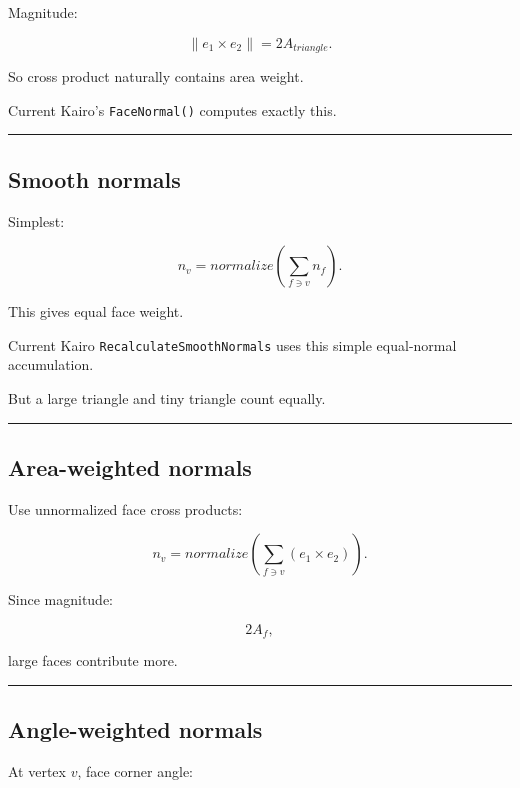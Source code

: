 Magnitude:

\[
\|e_1\times e_2\|
=
2A_{triangle}.
\]

So cross product naturally contains area weight.

Current Kairo's \texttt{FaceNormal()} computes exactly this.

\begin{center}\rule{0.5\linewidth}{0.5pt}\end{center}

\subsection{Smooth normals}\label{04-visual-computing-ii-ch041-smooth-normals}

Simplest:

\[
n_v=
normalize
\left(
\sum_{f\ni v}
n_f
\right).
\]

This gives equal face weight.

Current Kairo \texttt{RecalculateSmoothNormals} uses this simple equal-normal accumulation.

But a large triangle and tiny triangle count equally.

\begin{center}\rule{0.5\linewidth}{0.5pt}\end{center}

\subsection{Area-weighted normals}\label{04-visual-computing-ii-ch041-area-weighted-normals}

Use unnormalized face cross products:

\[
\boxed{
n_v
=
normalize
\left(
\sum_{f\ni v}
(e_1\times e_2)
\right).
}
\]

Since magnitude:

\[
2A_f,
\]

large faces contribute more.

\begin{center}\rule{0.5\linewidth}{0.5pt}\end{center}

\subsection{Angle-weighted normals}\label{04-visual-computing-ii-ch041-angle-weighted-normals}

At vertex \(v\), face corner angle:

